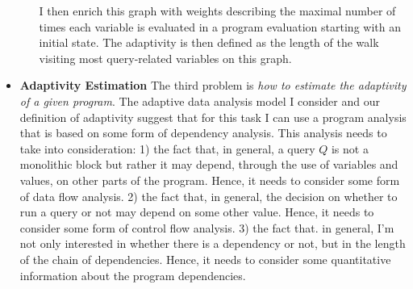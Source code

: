 \begin{itemize}
\begin{enumerate}
 I then enrich this graph with weights describing the maximal number of times each variable is evaluated in a program evaluation starting with an initial state. 
 The adaptivity is then defined as the length of the walk visiting most query-related variables on this graph. 
 \end{enumerate}
\item 
\textbf{Adaptivity Estimation}
The third problem is \emph{how to estimate the adaptivity of a given program}. 
The adaptive data analysis model I consider and our definition of adaptivity suggest that for this task I can use a program analysis that is based on some form of dependency analysis. This analysis needs to take into consideration:
1) the fact that, in general, a query $Q$ is not a monolithic block but rather it may depend, through the use of variables and values, on other parts of the program. 
Hence, it needs to consider some form of data flow analysis. 
2) the fact that, in general, the decision on whether to run a query or not may depend on some other value. Hence, 
 it needs to consider some form of control flow analysis.
3) the fact that. in general, I'm not only interested in whether there is a dependency or not, but in the length of the chain of dependencies. 
Hence, it needs to consider some quantitative information about the program dependencies. %


\end{itemize}
